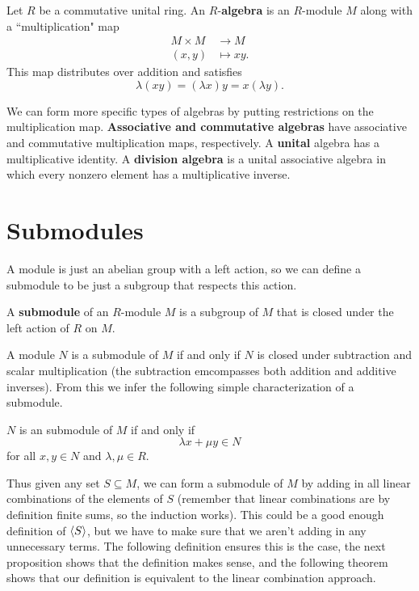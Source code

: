 \documentclass[twoside,10pt]{report}
\begin{document}
\begin{defn}[]
Let $R$ be a commutative unital ring. An $R$-\textbf{algebra} is an $R$-module $M$ along with a ``multiplication" map
\begin{align*}
	M \times M &\to M \\
	(x,y) &\mapsto xy.
\end{align*}
This map distributes over addition and satisfies
\[
	\lambda(xy) = (\lambda x)y = x (\lambda y).
\] 
\end{defn}
We can form more specific types of algebras by putting restrictions on the multiplication map. \textbf{Associative and commutative algebras} have associative and commutative multiplication maps, respectively. A \textbf{unital} algebra has a multiplicative identity. A \textbf{division algebra} is a unital associative algebra in which every nonzero element has a multiplicative inverse.

\section{Submodules}

A module is just an abelian group with a left action, so we can define a submodule to be just a subgroup that respects this action.

\begin{defn}[]
A \textbf{submodule} of an $R$-module $M$ is a subgroup of $M$ that is closed under the left action of $R$ on $M$.
\end{defn}

A module $N$ is a submodule of $M$ if and only if $N$ is closed under subtraction and scalar multiplication (the subtraction emcompasses both addition and additive inverses). From this we infer the following simple characterization of a submodule.
\begin{prop}
$N$ is an submodule of $M$ if and only if
\[
\lambda x + \mu y \in N
\] for all $x,y \in N$ and $\lambda,\mu \in R$.
\end{prop}

Thus given any set $S \subseteq M$, we can form a submodule of $M$ by adding in all linear combinations of the elements of $S$ (remember that linear combinations are by definition finite sums, so the induction works). This could be a good enough definition of $\langle S \rangle$, but we have to make sure that we aren't adding in any unnecessary terms. The following definition ensures this is the case, the next proposition shows that the definition makes sense, and the following theorem shows that our definition is equivalent to the linear combination approach.
\end{document}
